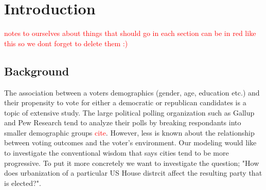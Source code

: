 \documentclass[12pt]{article}
\newcommand{\red}[1]{\textcolor{red}{#1}}
\begin{document}









\section{Introduction}


\textcolor{red}{notes to ourselves about things that should go in each section can be in red like this so we dont forget to delete them :)}


\subsection*{Background}
The association between a voters demographics (gender, age, education etc.) and their propensity to vote for either a democratic or republican candidates is a topic of extensive study. The large political polling organization such as Gallup and Pew Research tend to analyze their polls by breaking respondants into smaller demographic groups \red{cite}. However, less is known about the relationship between voting outcomes and the voter's environment. Our modeling would like to investigate the conventional wisdom that says cities tend to be more progressive. To put it more concretely we want to investigate the question; "How does urbanization of a particular US House distrcit affect the resulting party that is elected?". 
\end{document}
